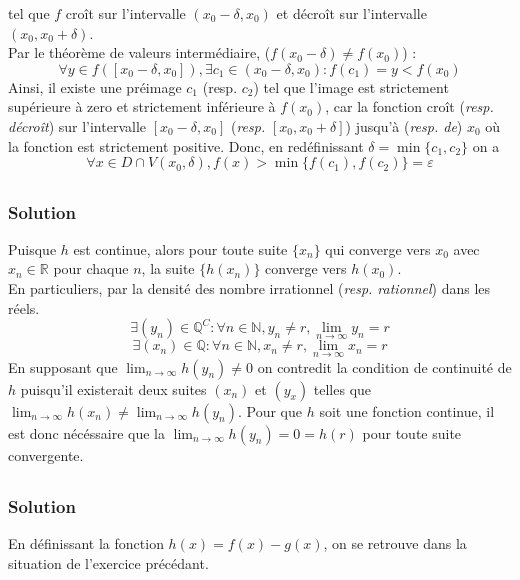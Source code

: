 			tel que $f$ croît sur l'intervalle $(x_0-\delta,x_0)$ et décroît sur l'intervalle $(x_0,x_0+\delta)$.\\
			Par le théorème de valeurs intermédiaire, ($f(x_0-\delta)\neq f(x_0)$) :
			\[
				\forall y\in f([x_0-\delta,x_0]),\exists c_1\in (x_0-\delta,x_0) : f(c_1)=y<f(x_0)
			\]
			Ainsi, il existe une préimage $c_1$ (resp. $c_2$) tel que l'image est strictement supérieure à zero et strictement inférieure à $f(x_0)$, car la fonction croît (\textit{resp. décroît}) sur l'intervalle $[x_0-\delta,x_0]$ (\textit{resp.} $[x_0,x_0+\delta]$) jusqu'à (\textit{resp. de}) $x_0$ où la fonction est strictement positive.
			Donc, en redéfinissant $\delta=\min\{c_1,c_2\}$ on a \[\forall x\in D\cap V(x_0,\delta), f(x)>\min\{f(c_1),f(c_2)\}=\varepsilon\]
		\subsection{}
		\subsubsection*{Solution}
			Puisque $h$ est continue, alors pour toute suite $\{x_n\}$ qui converge vers $x_0$ avec $x_n\in\mathbb{R}$ pour chaque $n$, la suite $\{h(x_n)\}$ converge vers $h(x_0)$.\\
			En particuliers, par la densité des nombre irrationnel (\textit{resp. rationnel}) dans les réels.
			\[
				\exists(y_n)\in\mathbb{Q}^C : \forall n\in\mathbb{N}, y_n\neq r, \lim_{n\to\infty} y_n = r
			\]
			\[
			\exists(x_n)\in\mathbb{Q} : \forall n\in\mathbb{N}, x_n\neq r, \lim_{n\to\infty} x_n = r
			\]
			En supposant que $\lim_{n\to\infty} h(y_n)\neq 0$ on contredit la condition de continuité de $h$ puisqu'il existerait deux suites $(x_n)$ et $(y_x)$ telles que $\lim_{n\to\infty} h(x_n)\neq \lim_{n\to\infty} h(y_n)$. Pour que $h$ soit une fonction continue, il est donc nécéssaire que la $\lim_{n\to\infty} h(y_n)= 0=h(r)$ pour toute suite convergente.
		\subsection{}
		\subsubsection*{Solution}
		En définissant la fonction $h(x)=f(x)-g(x)$, on se retrouve dans la situation de l'exercice précédant.